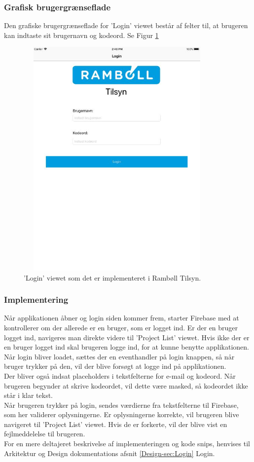 \subsubsection{Grafisk brugergrænseflade}
Den grafiske brugergrænseflade for 'Login' viewet består af felter til, at brugeren kan indtaste sit brugernavn og kodeord. Se Figur \ref{fig:LoginView}
\begin{figure}[H] %
	\centering
	\includegraphics[height=12cm, width=10cm]{Design/Applikation/Login/LoginView}
	\caption{'Login' viewet som det er implementeret i Rambøll Tilsyn.}
	\label{fig:LoginView}
\end{figure}

\subsubsection{Implementering}
Når applikationen åbner og login siden kommer frem, starter Firebase med at kontrollerer om der allerede er en bruger, som er logget ind. Er der en bruger logget ind, navigeres man direkte videre til 'Project List' viewet. Hvis ikke der er en bruger logget ind skal brugeren logge ind, for at kunne benytte applikationen. \\
Når login bliver loadet, sættes der en eventhandler på login knappen, så når bruger trykker på den, vil der blive forsøgt at logge ind på applikationen. \\
Der bliver også indsat placeholders i tekstfelterne for e-mail og kodeord. Når brugeren begynder at skrive kodeordet, vil dette være masked, så kodeordet ikke står i klar tekst. \\
Når brugeren trykker på login, sendes værdierne fra tekstfelterne til Firebase, som her validerer oplysningerne. Er oplysningerne korrekte, vil brugeren blive navigeret til 'Project List' viewet. Hvis de er forkerte, vil der blive vist en fejlmeddelelse til brugeren. \\
For en mere deltajeret beskrivelse af implementeringen og kode snips, henvises til Arkitektur og Design dokumentations afsnit \ref{Design-sec:Login} Login.

\clearpage